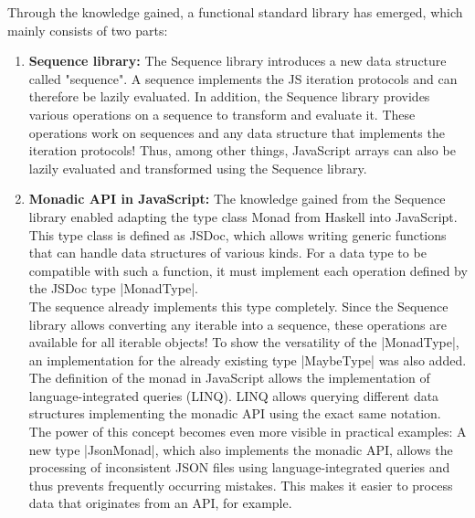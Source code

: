 Through the knowledge gained, a functional standard library has emerged, which
mainly consists of two parts:\\
\begin{enumerate}
  \item \textbf{Sequence library:} The Sequence library introduces a new data structure
called "sequence". A sequence implements the JS iteration protocols and can
therefore be lazily evaluated. In addition, the Sequence library provides
various operations on a sequence to transform and evaluate it. These operations
work on sequences and any data structure that implements the iteration
protocols! Thus, among other things, JavaScript arrays can also be lazily
evaluated and transformed using the Sequence library.
\item \textbf{Monadic API in JavaScript:} The knowledge gained from the Sequence
  library enabled adapting the type class Monad from Haskell into JavaScript.
  This type class is defined as JSDoc, which allows writing generic functions
  that can handle data structures of various kinds. For a data type to be
  compatible with such a function, it must implement each operation defined by
  the JSDoc type |MonadType|. \\ 
  The sequence already implements this type completely. Since the Sequence
  library allows converting any iterable into a sequence, these operations are
  available for all iterable objects! To show the versatility of the
  |MonadType|, an implementation for the already existing type |MaybeType| was
  also added. The definition of the monad in JavaScript allows the
  implementation of language-integrated queries (LINQ). LINQ allows querying
  different data structures implementing the monadic API using the exact same
  notation. \\ 
  The power of this concept becomes even more visible in practical examples: A
  new type |JsonMonad|, which also implements the monadic API, allows the
  processing of inconsistent JSON files using language-integrated queries and
  thus prevents frequently occurring mistakes. This makes it easier to process
  data that originates from an API, for example.
\end{enumerate}

